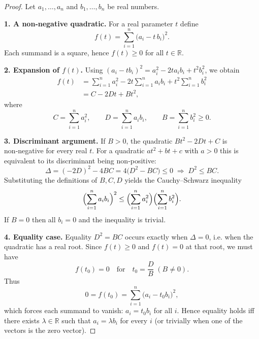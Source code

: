 \begin{proof}
Let \(a_{1},\dots ,a_{n}\) and \(b_{1},\dots ,b_{n}\) be real numbers.  

\medskip
\noindent\textbf{1. A non‑negative quadratic.}  
For a real parameter \(t\) define
\[
f(t)=\sum_{i=1}^{n}\bigl(a_{i}-t\,b_{i}\bigr)^{2}.
\]
Each summand is a square, hence \(f(t)\ge 0\) for all \(t\in\mathbb{R}\).

\medskip
\noindent\textbf{2. Expansion of \(f(t)\).}  
Using \((a_i-tb_i)^2=a_i^{2}-2t a_i b_i+t^{2}b_i^{2}\), we obtain
\[
\begin{aligned}
f(t)&=\sum_{i=1}^{n}a_{i}^{2}
      -2t\sum_{i=1}^{n}a_{i}b_{i}
      +t^{2}\sum_{i=1}^{n}b_{i}^{2}  \\
    &= C-2Dt+Bt^{2},
\end{aligned}
\]
where
\[
C=\sum_{i=1}^{n}a_{i}^{2},\qquad
D=\sum_{i=1}^{n}a_{i}b_{i},\qquad
B=\sum_{i=1}^{n}b_{i}^{2}\ge 0.
\]

\medskip
\noindent\textbf{3. Discriminant argument.}  
If \(B>0\), the quadratic \(Bt^{2}-2Dt+C\) is non‑negative for every real \(t\).  
For a quadratic \(at^{2}+bt+c\) with \(a>0\) this is equivalent to its
discriminant being non‑positive:
\[
\Delta =(-2D)^{2}-4BC = 4\bigl(D^{2}-BC\bigr)\le 0
\;\Longrightarrow\;
D^{2}\le BC.
\]
Substituting the definitions of \(B,C,D\) yields the Cauchy–Schwarz inequality
\[
\Bigl(\sum_{i=1}^{n}a_{i}b_{i}\Bigr)^{2}
\le
\Bigl(\sum_{i=1}^{n}a_{i}^{2}\Bigr)
\Bigl(\sum_{i=1}^{n}b_{i}^{2}\Bigr).
\]
If \(B=0\) then all \(b_{i}=0\) and the inequality is trivial.

\medskip
\noindent\textbf{4. Equality case.}  
Equality \(D^{2}=BC\) occurs exactly when \(\Delta=0\), i.e. when the
quadratic has a real root.  
Since \(f(t)\ge 0\) and \(f(t)=0\) at that root, we must have
\[
f(t_{0})=0\quad\text{for}\quad
t_{0}=\frac{D}{B}\;(B\neq0).
\]
Thus
\[
0=f(t_{0})=\sum_{i=1}^{n}\bigl(a_{i}-t_{0}b_{i}\bigr)^{2},
\]
which forces each summand to vanish:
\(a_{i}=t_{0}b_{i}\) for all \(i\).
Hence equality holds iff there exists \(\lambda\in\mathbb{R}\) such that
\(a_{i}=\lambda b_{i}\) for every \(i\) (or trivially when one of the vectors
is the zero vector).

\end{proof}